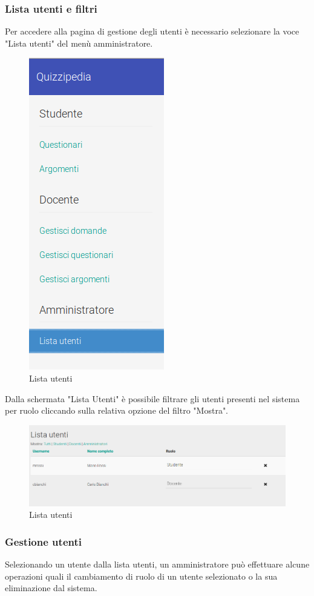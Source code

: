 \documentclass[12pt,a4paper]{article}
\begin{document}
	\subsubsection{Lista utenti e filtri}
		Per accedere alla pagina di gestione degli utenti è necessario selezionare la voce "Lista utenti" del menù amministratore.
		\begin{figure}[H]
			\centering
			\includegraphics[width=0.2\linewidth]{../img/screenshot/usersListMenu.png}
			\caption{Lista utenti}
			\label{Lista utenti}
		\end{figure}
        Dalla schermata "Lista Utenti" è possibile filtrare gli utenti presenti nel sistema per ruolo cliccando sulla relativa opzione del filtro "Mostra".
		\begin{figure}[H]
			
			\centering
			\includegraphics[width=1.0\linewidth]{../img/screenshot/usersListCrop.png}
			\caption{Lista utenti}
			\label{Lista utenti}
		\end{figure}
	
	\subsubsection{Gestione utenti}
	Selezionando un utente dalla lista utenti, un amministratore può effettuare alcune operazioni quali il cambiamento di ruolo di un utente selezionato o la sua eliminazione dal sistema.
		
\end{document}
